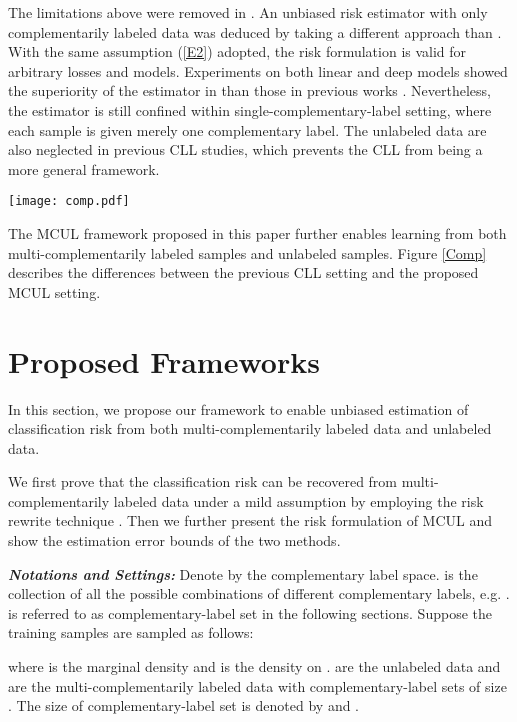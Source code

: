 \documentclass[]{article} \usepackage{geometry}
\begin{document}
The limitations above were removed in \cite{DBLP:conf/icml/IshidaNMS19}. An unbiased risk estimator with only complementarily labeled data was deduced by taking a different approach than \cite{DBLP:conf/nips/IshidaNHS17}. With the same assumption (\ref{E2}) adopted, the risk formulation is valid for arbitrary losses and models. Experiments on both linear and deep models showed the superiority of the estimator in \cite{DBLP:conf/icml/IshidaNMS19} than those in previous works \cite{DBLP:conf/nips/IshidaNHS17,DBLP:conf/eccv/YuLGT18}. Nevertheless, the estimator is still confined within single-complementary-label setting, where each sample is given merely one complementary label. The unlabeled data are also neglected in previous CLL studies, which prevents the CLL from being a more general framework.

\begin{figure*}[t]
    \centerline{\texttt{[image: comp.pdf]}}
    \caption{The demonstration of previous CCL setting and the proposed MCL\&MCUL settings.}
    \label{Comp}
\end{figure*}

The MCUL framework proposed in this paper further enables learning from both multi-complementarily labeled samples and unlabeled samples. Figure \ref{Comp} describes the differences between the previous CLL setting and the proposed MCUL setting.
\section{Proposed Frameworks}
In this section, we propose our framework to enable unbiased estimation of classification risk from both multi-complementarily labeled data and unlabeled data.

We first prove that the classification risk can be recovered from multi-complementarily labeled data under a mild assumption by employing the risk rewrite technique \cite{UU}. Then we further present the risk formulation of MCUL and show the estimation error bounds of the two methods.

{\em \textbf{Notations and Settings:}} Denote by  the complementary label space.  is the collection of all the possible combinations of  different complementary labels, e.g. .  is referred to as complementary-label set in the following sections. Suppose the training samples are sampled as follows:

where  is the marginal density and  is the density on .  are the unlabeled data and  are the multi-complementarily labeled data with complementary-label sets of size . The size of complementary-label set  is denoted by  and .
\end{document}
